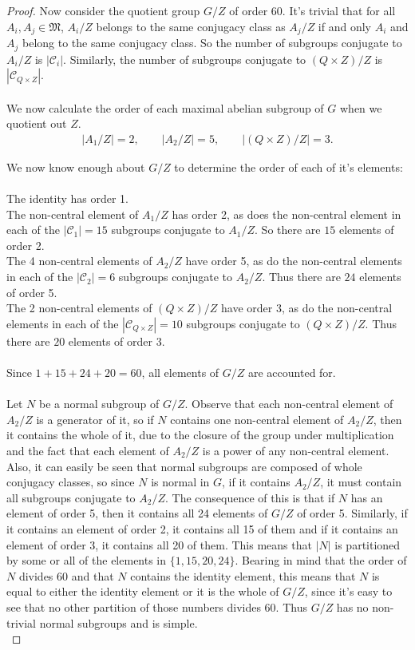 \documentclass[a4paper , 11pt]{book}
\theoremstyle{definition}
\theoremstyle{remark}
\begin{document}
\begin{proof}
Now consider the quotient group $G / Z$ of order 60. It's trivial that for all $A_i, A_j \in \mathfrak{M}$, $A_i / Z$ belongs to the same conjugacy class as $A_j / Z$ if and only $A_i$ and $A_j$ belong to the same conjugacy class. So the number of subgroups conjugate to $A_i / Z$ is $|\mathcal{C}_i|$. Similarly, the number of subgroups conjugate to $(Q\times Z) / Z$ is $|\mathcal{C}_{Q \times Z}|$. \\
\\
We now calculate the order of each maximal abelian subgroup of $G$ when we quotient out $Z$.
\begin{align*} |A_1 / Z| = 2, \qquad |A_2 / Z| = 5, \qquad |(Q \times Z) / Z| = 3.
\end{align*}

We now know enough about $G / Z$ to determine the order of each of it's elements: \\
\\
\textbullet \space The identity has order 1. \\
\textbullet \space The non-central element of $A_1 / Z$ has order 2, as does the non-central element in each of the $|\mathcal{C}_1| = 15$ subgroups conjugate to $A_1 / Z$. So there are $15$ elements of order 2. \\
\textbullet \space The 4 non-central elements of $A_2 / Z$ have order 5, as do the non-central elements in each of the $|\mathcal{C}_2| = 6$ subgroups conjugate to $A_2 / Z$. Thus there are $24$ elements of order 5. \\
\textbullet \space  The 2 non-central elements of $(Q \times Z) / Z$ have order 3, as do the non-central elements in each of the $|\mathcal{C}_{Q \times Z}| = 10$ subgroups conjugate to $(Q \times Z) / Z$. Thus there are $20$ elements of order 3. \\
\\
Since $1+15+24+20=60$, all elements of $G / Z$ are accounted for. \\
\\
Let $N$ be a normal subgroup of $G / Z$. Observe that each non-central element of $A_2 / Z$ is a generator of it, so if $N$ contains one non-central element of $A_2 / Z$, then it contains the whole of it, due to the closure of the group under multiplication and the fact that each element of $A_2 / Z$ is a power of any non-central element. Also, it can easily be seen that normal subgroups are composed of whole conjugacy classes, so since $N$ is normal in $G$, if it contains $A_2 / Z$, it must contain all subgroups conjugate to $A_2 / Z$. The consequence of this is that if $N$ has an element of order 5, then it contains all 24 elements of $G / Z$ of order 5. Similarly, if it contains an element of order 2, it contains all 15 of them and if it contains an element of order 3, it contains all 20 of them. This means that $|N|$ is partitioned by some or all of the elements in $\{ 1, 15, 20, 24 \}$. Bearing in mind that the order of $N$ divides 60 and that $N$ contains the identity element, this means that $N$ is equal to either the identity element or it is the whole of $G / Z$, since it's easy to see that no other partition of those numbers divides 60. Thus $G / Z$ has no non-trivial normal subgroups and is simple. \\

\end{proof}
\end{document}
